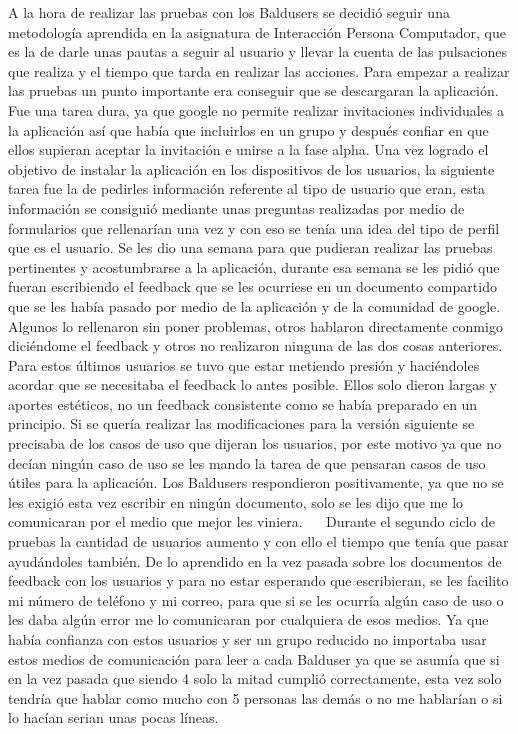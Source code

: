 A la hora de realizar las pruebas con los Baldusers se decidió seguir una metodología aprendida en la asignatura de Interacción Persona Computador, que es la de darle unas pautas a seguir al usuario y llevar la cuenta de las pulsaciones que realiza y el tiempo que tarda en realizar las acciones.
Para empezar a realizar las pruebas un punto importante era conseguir que se descargaran la aplicación.
Fue una tarea dura, ya que google no permite realizar invitaciones individuales a la aplicación así que había que incluirlos en un grupo y después confiar en que ellos supieran aceptar la invitación e unirse a la fase alpha.
Una vez logrado el objetivo de instalar la aplicación en los dispositivos de los usuarios, la siguiente tarea fue la de pedirles información referente al tipo de usuario que eran, esta información se consiguió mediante unas preguntas realizadas por medio de formularios que rellenarían una vez y con eso se tenía una idea del tipo de perfil que es el usuario. 
Se les dio una semana para que pudieran realizar las pruebas pertinentes y acostumbrarse a la aplicación, durante esa semana se les pidió que fueran escribiendo el feedback que se les ocurriese en un documento compartido que se les había pasado por medio de la aplicación y de la comunidad de google.
Algunos lo rellenaron sin poner problemas, otros hablaron directamente conmigo diciéndome el feedback y otros no realizaron ninguna de las dos cosas anteriores.
Para estos últimos usuarios se tuvo que estar metiendo presión y haciéndoles acordar que se necesitaba el feedback lo antes posible. Ellos solo dieron largas y aportes estéticos, no un feedback consistente como se había preparado en un principio.
Si se quería realizar las modificaciones para la versión siguiente se precisaba de los casos de uso que dijeran los usuarios, por este motivo ya que no decían ningún caso de uso se les mando la tarea de que pensaran casos de uso útiles para la aplicación.
Los Baldusers respondieron positivamente, ya que no se les exigió esta vez escribir en ningún documento, solo se les dijo que me lo comunicaran por el medio que mejor les viniera.
 
Durante el segundo ciclo de pruebas la cantidad de usuarios aumento y con ello el tiempo que tenía que pasar ayudándoles también.
De lo aprendido en la vez pasada sobre los documentos de feedback con los usuarios y para no estar esperando que escribieran, se les facilito mi número de teléfono y mi correo, para que si se les ocurría algún caso de uso o les daba algún error me lo comunicaran por cualquiera de esos medios. Ya que había confianza con estos usuarios y ser un grupo reducido no importaba usar estos medios de comunicación para leer a cada Balduser ya que se asumía que si en la vez pasada que siendo 4 solo la mitad cumplió correctamente, esta vez solo tendría que hablar como mucho con 5 personas las demás o no me hablarían o si lo hacían serian unas pocas líneas.

